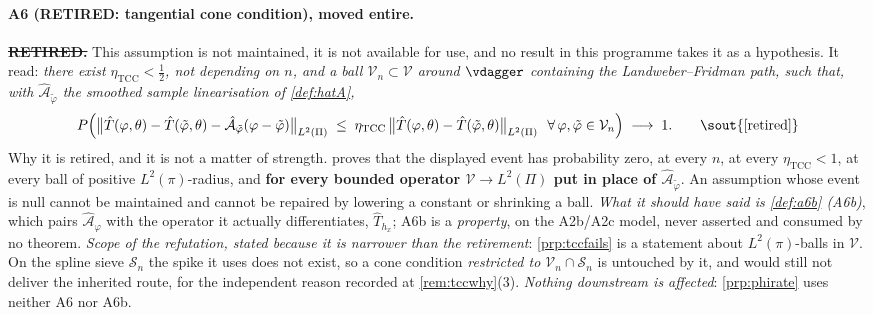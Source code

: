 \paragraph{A6 (RETIRED: tangential cone condition), moved entire.}

\begin{assumption}\label{ass:tcc}
\textbf{\sout{RETIRED.}} This assumption is not maintained, it is not available for use, and no
result in this programme takes it as a hypothesis. It read: \emph{there exist
$\eta_{\mathrm{TCC}}<\tfrac12$, not depending on $n$, and a ball
$\mathcal V_n\subset\mathcal V$ around $\vdagger$ containing the Landweber--Fridman path, such that, with
$\hat{\mathcal A}_{\tilde\varphi}$ the smoothed sample linearisation of \cref{def:hatA},}
\[
P\Big(\big\|\hat T(\varphi,\theta)-\hat T(\tilde\varphi,\theta)-\hat{\mathcal A}_{\tilde\varphi}(\varphi-\tilde\varphi)\big\|_{L^2(\Pi)}
\;\le\;\eta_{\mathrm{TCC}}\,\big\|\hat T(\varphi,\theta)-\hat T(\tilde\varphi,\theta)\big\|_{L^2(\Pi)}
\ \ \forall\,\varphi,\tilde\varphi\in\mathcal V_n\Big)\;\longrightarrow\;1 .
\qquad\text{\sout{[retired]}}
\]
Why it is retired, and it is not a matter of strength.  proves that the
displayed event has probability zero, at every $n$, at every $\eta_{\mathrm{TCC}}<1$, at every ball
of positive $L^{2}(\pi)$-radius, and \textbf{for every bounded operator $\mathcal V\to L^{2}(\Pi)$ put
in place of $\hat{\mathcal A}_{\tilde\varphi}$}. An assumption whose event is null cannot be maintained
and cannot be repaired by lowering a constant or shrinking a ball.
\emph{What it should have said is \cref{def:a6b} (A6b)}, which pairs $\hat{\mathcal A}_\varphi$ with the
operator it actually differentiates, $\hat T_{h_x}$; A6b is a \emph{property}, on the A2b/A2c model,
never asserted and consumed by no theorem. \emph{Scope of the refutation, stated because it is
narrower than the retirement}: \cref{prp:tccfails} is a statement about $L^{2}(\pi)$-balls in
$\mathcal V$. On the spline sieve $\mathcal S_n$ the spike it uses does not exist, so a cone condition
\emph{restricted to $\mathcal V_n\cap\mathcal S_n$} is untouched by it, and would still not deliver
the inherited route, for the independent reason recorded at \cref{rem:tccwhy}\textup{(3)}.
\emph{Nothing downstream is affected}: \cref{prp:phirate} uses neither A6 nor A6b.
\end{assumption}

